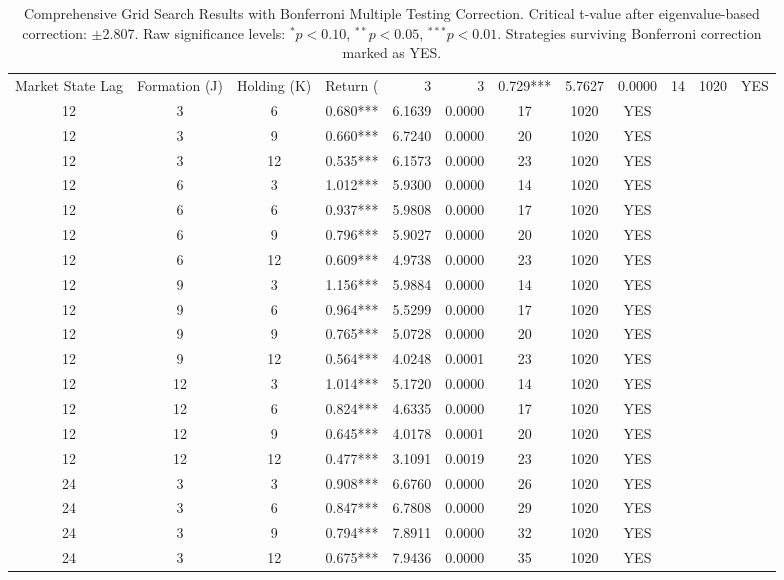 \begin{table}[htbp]
\caption{Comprehensive Grid Search Results with Bonferroni Multiple Testing Correction. Critical t-value after eigenvalue-based correction: $\pm$2.807. Raw significance levels: $^{*}p<0.10$, $^{**}p<0.05$, $^{***}p<0.01$. Strategies surviving Bonferroni correction marked as YES.}
\label{tab:grid_search_bonferroni_comprehensive}
\begin{tabular}{ccc|rrrcc|c}
\toprule
Market State Lag & Formation (J) & Holding (K) & Return (%
 & 3 & 3 & 0.729*** & 5.7627 & 0.0000 & 14 & 1020 & YES \\
12 & 3 & 6 & 0.680*** & 6.1639 & 0.0000 & 17 & 1020 & YES \\
12 & 3 & 9 & 0.660*** & 6.7240 & 0.0000 & 20 & 1020 & YES \\
12 & 3 & 12 & 0.535*** & 6.1573 & 0.0000 & 23 & 1020 & YES \\
12 & 6 & 3 & 1.012*** & 5.9300 & 0.0000 & 14 & 1020 & YES \\
12 & 6 & 6 & 0.937*** & 5.9808 & 0.0000 & 17 & 1020 & YES \\
12 & 6 & 9 & 0.796*** & 5.9027 & 0.0000 & 20 & 1020 & YES \\
12 & 6 & 12 & 0.609*** & 4.9738 & 0.0000 & 23 & 1020 & YES \\
12 & 9 & 3 & 1.156*** & 5.9884 & 0.0000 & 14 & 1020 & YES \\
12 & 9 & 6 & 0.964*** & 5.5299 & 0.0000 & 17 & 1020 & YES \\
12 & 9 & 9 & 0.765*** & 5.0728 & 0.0000 & 20 & 1020 & YES \\
12 & 9 & 12 & 0.564*** & 4.0248 & 0.0001 & 23 & 1020 & YES \\
12 & 12 & 3 & 1.014*** & 5.1720 & 0.0000 & 14 & 1020 & YES \\
12 & 12 & 6 & 0.824*** & 4.6335 & 0.0000 & 17 & 1020 & YES \\
12 & 12 & 9 & 0.645*** & 4.0178 & 0.0001 & 20 & 1020 & YES \\
12 & 12 & 12 & 0.477*** & 3.1091 & 0.0019 & 23 & 1020 & YES \\
24 & 3 & 3 & 0.908*** & 6.6760 & 0.0000 & 26 & 1020 & YES \\
24 & 3 & 6 & 0.847*** & 6.7808 & 0.0000 & 29 & 1020 & YES \\
24 & 3 & 9 & 0.794*** & 7.8911 & 0.0000 & 32 & 1020 & YES \\
24 & 3 & 12 & 0.675*** & 7.9436 & 0.0000 & 35 & 1020 & YES \\

\end{tabular}
\end{table}
